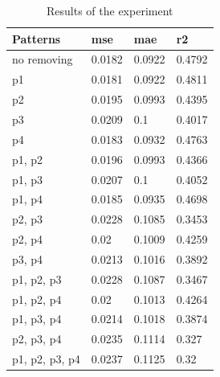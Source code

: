 \documentclass[12pt]{article}
\begin{document}
\begin{table}[h] \centering
\begin{tabular}{ | l | l | l | l |} 
	\hline
	Patterns & mse & mae & r2  \\ \hline
	no removing & 0.0182 & 0.0922 &  0.4792 \\ \hline
	p1 & 0.0181 & 0.0922 & 0.4811  \\ \hline
	p2 & 0.0195 & 0.0993 & 0.4395 \\ \hline
	p3 & 0.0209 & 0.1 & 0.4017 \\ \hline
	p4 & 0.0183 & 0.0932 & 0.4763 \\ \hline
	p1, p2 & 0.0196 & 0.0993 & 0.4366 \\ \hline
	p1, p3 & 0.0207 & 0.1 & 0.4052 \\ \hline
	p1, p4 & 0.0185 & 0.0935 & 0.4698 \\ \hline
	p2, p3 & 0.0228 & 0.1085 & 0.3453 \\ \hline
	p2, p4 & 0.02 & 0.1009 &  0.4259 \\ \hline
	p3, p4 & 0.0213 & 0.1016 & 0.3892 \\ \hline
	p1, p2, p3 & 0.0228 & 0.1087 & 0.3467 \\ \hline
	p1, p2, p4 & 0.02 & 0.1013 & 0.4264 \\ \hline
	p1, p3, p4 & 0.0214 & 0.1018 & 0.3874 \\ \hline
	p2, p3, p4 & 0.0235 & 0.1114 & 0.327 \\ \hline
	p1, p2, p3, p4 & 0.0237 & 0.1125 & 0.32 \\ \hline
\end{tabular}
\label{results}
\caption{Results of the experiment}
\end{table}
\newpage
\end{document}
